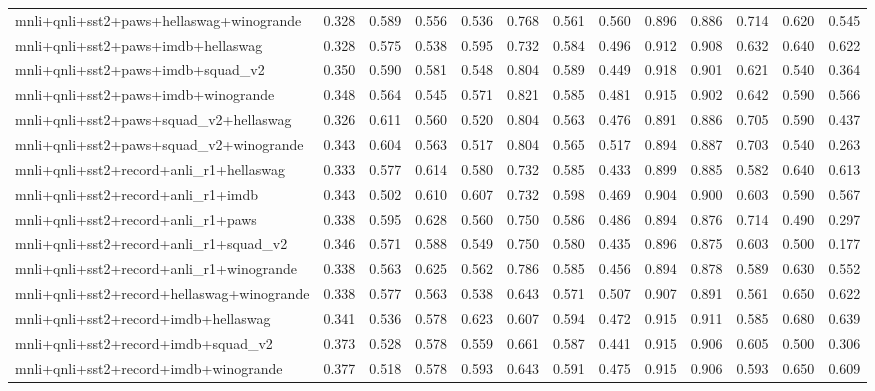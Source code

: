\begin{table}[t]
\begin{tabular}{lrrrrrrrrrrrr}
    mnli+qnli+sst2+paws+hellaswag+winogrande & 0.328 & 0.589 & 0.556 & 0.536 & 0.768 & 0.561 & 0.560 & 0.896 & 0.886 & 0.714 & 0.620 & 0.545 \\
    mnli+qnli+sst2+paws+imdb+hellaswag & 0.328 & 0.575 & 0.538 & 0.595 & 0.732 & 0.584 & 0.496 & 0.912 & 0.908 & 0.632 & 0.640 & 0.622 \\
    mnli+qnli+sst2+paws+imdb+squad\_v2 & 0.350 & 0.590 & 0.581 & 0.548 & 0.804 & 0.589 & 0.449 & 0.918 & 0.901 & 0.621 & 0.540 & 0.364 \\
    mnli+qnli+sst2+paws+imdb+winogrande & 0.348 & 0.564 & 0.545 & 0.571 & 0.821 & 0.585 & 0.481 & 0.915 & 0.902 & 0.642 & 0.590 & 0.566 \\
    mnli+qnli+sst2+paws+squad\_v2+hellaswag & 0.326 & 0.611 & 0.560 & 0.520 & 0.804 & 0.563 & 0.476 & 0.891 & 0.886 & 0.705 & 0.590 & 0.437 \\
    mnli+qnli+sst2+paws+squad\_v2+winogrande & 0.343 & 0.604 & 0.563 & 0.517 & 0.804 & 0.565 & 0.517 & 0.894 & 0.887 & 0.703 & 0.540 & 0.263 \\
    mnli+qnli+sst2+record+anli\_r1+hellaswag & 0.333 & 0.577 & 0.614 & 0.580 & 0.732 & 0.585 & 0.433 & 0.899 & 0.885 & 0.582 & 0.640 & 0.613 \\
    mnli+qnli+sst2+record+anli\_r1+imdb & 0.343 & 0.502 & 0.610 & 0.607 & 0.732 & 0.598 & 0.469 & 0.904 & 0.900 & 0.603 & 0.590 & 0.567 \\
    mnli+qnli+sst2+record+anli\_r1+paws & 0.338 & 0.595 & 0.628 & 0.560 & 0.750 & 0.586 & 0.486 & 0.894 & 0.876 & 0.714 & 0.490 & 0.297 \\
    mnli+qnli+sst2+record+anli\_r1+squad\_v2 & 0.346 & 0.571 & 0.588 & 0.549 & 0.750 & 0.580 & 0.435 & 0.896 & 0.875 & 0.603 & 0.500 & 0.177 \\
    mnli+qnli+sst2+record+anli\_r1+winogrande & 0.338 & 0.563 & 0.625 & 0.562 & 0.786 & 0.585 & 0.456 & 0.894 & 0.878 & 0.589 & 0.630 & 0.552 \\
    mnli+qnli+sst2+record+hellaswag+winogrande & 0.338 & 0.577 & 0.563 & 0.538 & 0.643 & 0.571 & 0.507 & 0.907 & 0.891 & 0.561 & 0.650 & 0.622 \\
    mnli+qnli+sst2+record+imdb+hellaswag & 0.341 & 0.536 & 0.578 & 0.623 & 0.607 & 0.594 & 0.472 & 0.915 & 0.911 & 0.585 & 0.680 & 0.639 \\
    mnli+qnli+sst2+record+imdb+squad\_v2 & 0.373 & 0.528 & 0.578 & 0.559 & 0.661 & 0.587 & 0.441 & 0.915 & 0.906 & 0.605 & 0.500 & 0.306 \\
    mnli+qnli+sst2+record+imdb+winogrande & 0.377 & 0.518 & 0.578 & 0.593 & 0.643 & 0.591 & 0.475 & 0.915 & 0.906 & 0.593 & 0.650 & 0.609 \\

\end{tabular}
\end{table}
